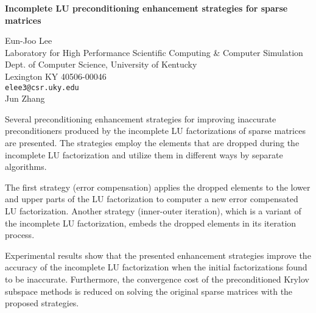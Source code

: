 \documentclass{report}
\begin{document}

\begin{center}
{\large
{\bf Incomplete LU preconditioning enhancement strategies for sparse matrices}}

	Eun-Joo Lee \\
	Laboratory for High Performance Scientific Computing
		\& Computer Simulation \\
	Dept. of Computer Science, University of Kentucky \\
	Lexington KY 40506-00046 \\
	{\tt elee3@csr.uky.edu}
	\\ Jun Zhang
\end{center}
Several preconditioning enhancement strategies for improving
inaccurate preconditioners produced by the incomplete LU
factorizations of sparse matrices are presented.  The strategies
employ the elements that are dropped during the incomplete LU
factorization and utilize them in different ways by separate
algorithms.

 The first strategy (error compensation) applies the
dropped elements to the lower and upper parts of the LU
factorization to computer a new error compensated LU factorization.
Another strategy (inner-outer iteration), which is a variant of the
incomplete LU factorization, embeds the dropped elements in its
iteration process.

Experimental results show that the presented
enhancement strategies improve the accuracy of the incomplete LU
factorization when the initial factorizations found to be
inaccurate.  Furthermore, the convergence cost of the preconditioned
Krylov subspace methods is reduced on solving the original sparse
matrices with the proposed strategies.


\end{document}
